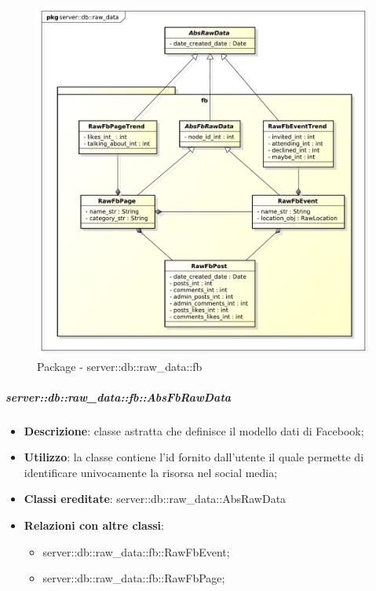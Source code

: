 

		\begin{figure}[htbp]
			\centering
			\centerline{\includegraphics[scale=0.5]{./images/server/raw_data_fb.pdf}}
			\caption{Package - server::db::raw\_data::fb}
		\end{figure}


		\subparagraph{server::db::raw\_data::fb::AbsFbRawData} %
		\label{subp:server_db_raw_data_fb_absfbrawdata}
			\begin{itemize}
				\item \textbf{Descrizione}: classe astratta che definisce il modello dati di Facebook;
				\item \textbf{Utilizzo}: la classe contiene l'id fornito dall'utente il quale permette di identificare univocamente la risorsa nel social media;
				\item \textbf{Classi ereditate}: server::db::raw\_data::AbsRawData
				\item \textbf{Relazioni con altre classi}:
					\begin{itemize}
						\item server::db::raw\_data::fb::RawFbEvent;
						\item server::db::raw\_data::fb::RawFbPage;
					\end{itemize}
			\end{itemize}



